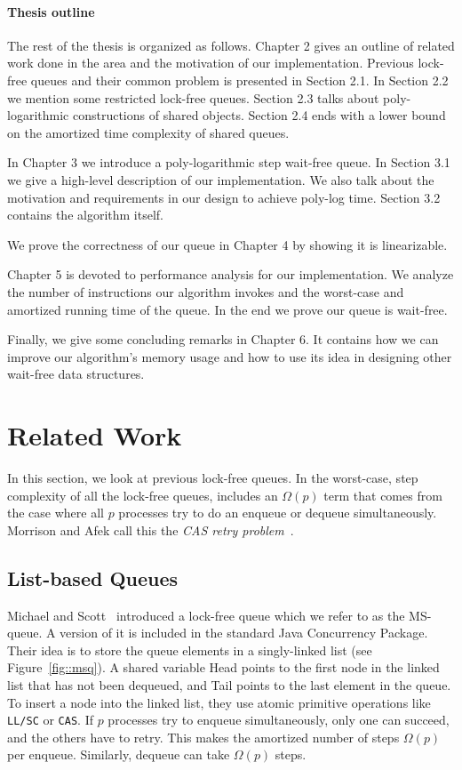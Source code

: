 \documentclass[10pt]{article}
\newcommand{\nf}[1]{{\normalfont{\texttt{#1}}}}
\theoremstyle{definition}
\begin{document}
\paragraph{Thesis outline} The rest of the thesis is organized as follows. Chapter 2 gives an outline of related work done in the area and the motivation of our implementation. Previous lock-free queues and their common problem is presented in Section 2.1. In Section 2.2 we mention some restricted lock-free queues. Section 2.3 talks about poly-logarithmic constructions of shared objects. Section 2.4 ends with a lower bound on the amortized time complexity of shared queues.

In Chapter 3 we introduce a poly-logarithmic step wait-free queue. In Section 3.1 we give a high-level description of our implementation. We also talk about the motivation and requirements in our design to achieve poly-log time. Section 3.2 contains the algorithm itself.

We prove the correctness of our queue in Chapter 4 by showing it is linearizable.

Chapter 5 is devoted to performance analysis for our implementation. We analyze the number of \nf{CAS} instructions our algorithm invokes and the worst-case and amortized running time of the queue. In the end we prove our queue is wait-free.

Finally, we give some concluding remarks in Chapter 6. It contains how we can improve our algorithm's memory usage and how to use its idea in designing other wait-free data structures.

\pagebreak
\section{Related Work}
In this section, we look at previous lock-free queues. In the worst-case, step complexity of all the lock-free queues, includes an $\Omega(p)$ term that comes from the case where all $p$ processes try to do an enqueue or dequeue simultaneously. Morrison and Afek call this the \textit{CAS retry problem}~\cite{DBLP:conf/ppopp/MorrisonA13}. 

\subsection{List-based Queues}
Michael and Scott~\cite{DBLP:conf/podc/MichaelS96} introduced a lock-free queue which we refer to as the MS-queue. A version of it is included in the standard Java Concurrency Package. Their idea is to store the queue elements in a singly-linked list (see Figure~\ref{fig::msq}). A shared variable Head points to the first node in the linked list that has not been dequeued, and Tail points to the last element in the queue. To insert a node into the linked list, they use atomic primitive operations like \texttt{LL/SC} or \texttt{CAS}. If $p$ processes try to enqueue simultaneously, only one can succeed, and the others have to retry. This makes the amortized number of steps $\Omega(p)$ per enqueue. Similarly, dequeue can take $\Omega(p)$ steps.
\end{document}
